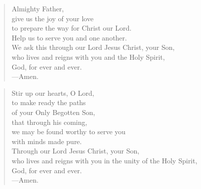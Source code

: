 \prayer

\setlength{\vleftmargin}{\prayerleftmargini}

\begin{verse}
Almighty Father,\\
give us the joy of your love\\
to prepare the way for Christ our Lord.\\
Help us to serve you and one another.\\
We ask this through our Lord Jesus Christ, your Son,\\
who lives and reigns with you and the Holy Spirit,\\
God, for ever and ever.\\
{\color{red}---\thinspace}Amen.
\end{verse}


\begin{verse}
Stir up our hearts, O Lord,\\
to make ready the paths\\
of your Only Begotten Son,\\
that through his coming,\\
we may be found worthy to serve you\\
with minds made pure.\\
Through our Lord Jesus Christ, your Son,\\
who lives and reigns with you in the unity of the Holy Spirit,\\
God, for ever and ever.\\
{\color{red}---\thinspace}Amen.
\end{verse}

\setlength{\vleftmargin}{\defleftmargini}